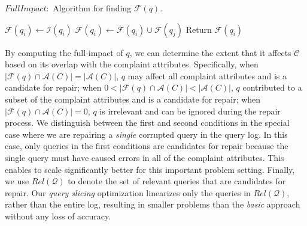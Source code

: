
\begin{algorithm}[t]
\scriptsize
\caption{$FullImpact:$ Algorithm for finding $\mathcal{F}(q)$.}
\label{alg:fullimpact}
\begin{algorithmic}[2]
\STATE $\mathcal{F}(q_i) \leftarrow \mathcal{I}(q_i)$
\STATE $\mathcal{F}(q_i) \leftarrow \mathcal{F}(q_i) \cup \mathcal{F}(q_j)$
\ENDIF
\ENDFOR
\STATE Return $\mathcal{F}(q_i)$
\end{algorithmic}
\end{algorithm}
\vspace*{-.1in}

By computing the full-impact of $q$, we can determine the extent that it affects $\mathcal{C}$
based on its overlap with the complaint attributes.
Specifically, 
when $|\mathcal{F}(q) \cap \mathcal{A}(C)|=|\mathcal{A}(C)|$, $q$ may affect all complaint attributes and is a candidate for repair; 
when $0 < |\mathcal{F}(q) \cap \mathcal{A}(C)| < |\mathcal{A}(C)|$, 
$q$ contributed to a subset of the complaint attributes and is a candidate for repair;
when $|\mathcal{F}(q) \cap \mathcal{A}(C)|=0$, $q$ is irrelevant 
and can be ignored during the repair process.
We distinguish between the first and second conditions in the special case where we are repairing a \emph{single} 
corrupted query in the query log.  In this case, only queries in the first conditions are candidates for repair because 
the single query must have caused errors in all of the complaint attributes.  This enables \sys to scale significantly better
for this important problem setting. 
Finally, we use $Rel\mathcal{(Q)}$ to denote the set of relevant
queries that are candidates for repair. Our \emph{query slicing}
optimization linearizes only the queries in
$Rel\mathcal{(Q)}$, rather than the entire log, resulting in
smaller problems than the \emph{basic} approach without any loss of accuracy.


